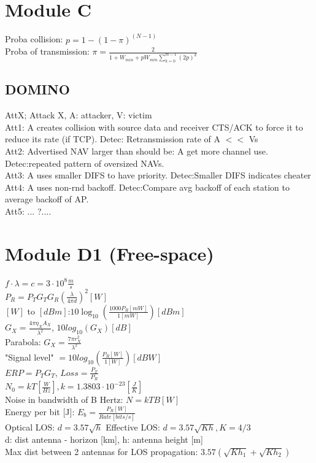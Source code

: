 \documentclass[10pt,a4paper,landscape]{article}
\begin{document}
\begin{multicols*}{4}
\section{Module C}
Proba collision: $p = 1-(1-\pi)^(N-1)$ \\
Proba of transmission: $\pi = \frac{2}{1+W_{min}+pW_{min}\sum\limits_{k=0}^{m-1}(2p)^k}$\\
\subsection{DOMINO}
AttX; Attack X, A: attacker, V: victim\\
Att1: A creates collision with source data and receiver CTS/ACK to force it to reduce its rate (if TCP). Detec: Retransmission rate of A $<<$ Vs\\
Att2: Advertised NAV larger than should be: A get more channel use. Detec:repeated pattern of oversized NAVs.\\
Att3: A uses smaller DIFS to have priority. Detec:Smaller DIFS indicates cheater\\
Att4: A uses non-rnd backoff. Detec:Compare avg backoff of each station to average backoff of AP.\\
Att5: ... ?....

\section{Module D1 (Free-space)}
$f \cdot \lambda = c = 3 \cdot 10^8 \frac{m}{s}$\\
$P_R = P_TG_TG_R(\frac{\lambda}{4\pi d})^2 [W]$\\
$[W]$ to $[dBm]$:$10\log_{10}(\frac{1000P_R[mW]}{1[mW]})[dBm]$\\
$G_X = \frac{4\pi \eta_X A_X}{\lambda^2}$, $10log_{10}(G_X)[dB]$\\
Parabola: $G_X = \frac{7\pi r_X^2}{\lambda^2}$\\
"Signal level" $= 10log_{10}(\frac{P_R[W]}{1[W]})[dBW]$ \\
$ERP = P_TG_T$, $Loss = \frac{P_T}{P_R}$\\
$N_0 = kT[\frac{W}{Hz}], k = 1.3803 \cdot 10^{-23}[\frac{J}{K}]$\\
Noise in bandwidth of B Hertz: $N = kTB [W]$\\
Energy per bit [J]: $E_b = \frac{P_R[W]}{Rate[bits/s]}$\\
Optical LOS: $d = 3.57\sqrt{h}$
Effective LOS: $d = 3.57\sqrt{Kh}, K=4/3$\\
d: dist antenna - horizon [km], h: antenna height [m]\\
Max dist between 2 antennas for LOS propagation: $3.57(\sqrt{Kh_1}+\sqrt{Kh_2})$


\end{multicols*}
\end{document}
